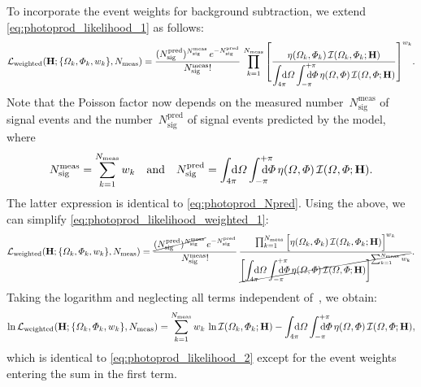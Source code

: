 To incorporate the event weights  for background subtraction,
we extend \cref{eq:photoprod_likelihood_1} as follows:
\begin{equation}
  \label{eq:photoprod_likelihood_weighted_1}
  \mathcal{L}_\text{weighted}(\vect{H}; \set{\Omega_k, \Phi_k, w_k}, N_\text{meas})
  = \frac{(N_\text{sig}^\text{pred})^{N_\text{sig}^\text{meas}}\, e^{-N_\text{sig}^\text{pred}}}{N_\text{sig}^\text{meas}!}\,
  \prod_{k = 1}^{N_\text{meas}}
  \Biggg[ \frac{\eta(\Omega_k, \Phi_k)\, \intensity(\Omega_k, \Phi_k; \vect{H})}%
  {\dint_{4 \pi}\!\!\!\! \dif{\Omega} \dint_{-\pi}^{+\pi}\hspace{-1.2em} \dif{\Phi}\, \eta(\Omega, \Phi)\, \intensity(\Omega, \Phi; \vect{H})} \Biggg]^{w_k}.
\end{equation}
Note that the Poisson factor now depends on the measured
number~$N_\text{sig}^\text{meas}$ of signal events and the
number~$N_\text{sig}^\text{pred}$ of signal events predicted by the
model, where
\begin{equation}
  N_\text{sig}^\text{meas}
  = \sum_{k = 1}^{N_\text{meas}} w_k
  \quad\text{and}\quad
  N_\text{sig}^\text{pred}
  = \int_{4 \pi}\!\!\!\! \dif{\Omega} \int_{-\pi}^{+\pi}\hspace{-1.2em} \dif{\Phi}\, \eta(\Omega, \Phi)\, \intensity(\Omega, \Phi; \vect{H}).
\end{equation}
The latter expression is identical to \cref{eq:photoprod_Npred}.
Using the above, we can simplify
\cref{eq:photoprod_likelihood_weighted_1}:
\begin{equation}
  \mathcal{L}_\text{weighted}(\vect{H}; \set{\Omega_k, \Phi_k, w_k}, N_\text{meas})
  = \frac{\cancel{(N_\text{sig}^\text{pred})^{N_\text{sig}^\text{meas}}}\, e^{-N_\text{sig}^\text{pred}}}{N_\text{sig}^\text{meas}!}\,
  \frac{\prod_{k = 1}^{N_\text{meas}} \sBrk[2]{\eta(\Omega_k, \Phi_k)\, \intensity(\Omega_k, \Phi_k; \vect{H})}^{w_k}}%
  {\cancel{\sBrk[3]{\dint_{4 \pi}\!\!\!\! \dif{\Omega} \dint_{-\pi}^{+\pi}\hspace{-1.2em} \dif{\Phi}\, \eta(\Omega, \Phi)\, \intensity(\Omega, \Phi; \vect{H})}%
  ^{\sum_{k = 1}^{N_\text{meas}} w_k}}}.
\end{equation}
Taking the logarithm and neglecting all terms independent of~,
we obtain:
\begin{equation}
  \label{eq:photoprod_log_likelihood_weighted}
  \ln \mathcal{L}_\text{weighted}(\vect{H}; \set{\Omega_k, \Phi_k, w_k}, N_\text{meas})
  = \sum_{k = 1}^{N_\text{meas}} w_k\, \ln \intensity(\Omega_k, \Phi_k; \vect{H})
  - \int_{4 \pi}\!\!\!\! \dif{\Omega} \int_{-\pi}^{+\pi}\hspace{-1.2em} \dif{\Phi}\, \eta(\Omega, \Phi)\, \intensity(\Omega, \Phi; \vect{H}),
\end{equation}
which is identical to \cref{eq:photoprod_likelihood_2} except for the
event weights entering the sum in the first term.

